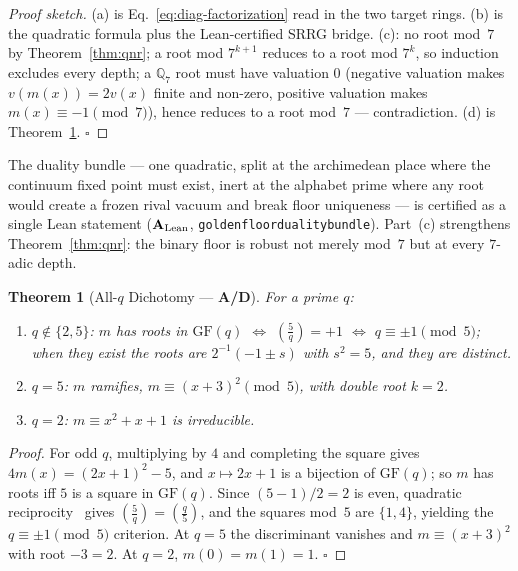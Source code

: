 \documentclass[11pt]{article}
\newtheorem{theorem}{Theorem}[section]
\theoremstyle{remark}
\newcommand{\GF}[1]{\ensuremath{\mathrm{GF}(#1)}}
\newcommand{\lean}[1]{%
  \penalty-100
  \begingroup\def\_{\textunderscore\allowbreak}\texttt{#1}\endgroup}
\newcommand{\CatAL}{\texorpdfstring{\ensuremath{\textbf{A}_{\rm Lean}}}{A-Lean}}
\newcommand{\CatAD}{\textbf{A/D}}
\begin{document}
\begin{proof}[Proof sketch]
(a) is Eq.~\eqref{eq:diag-factorization} read in the two target rings.
(b) is the quadratic formula plus the Lean-certified SRRG bridge.
(c): no root mod~$7$ by Theorem~\ref{thm:qnr}; a root mod $7^{k+1}$ reduces
to a root mod $7^k$, so induction excludes every depth; a $\mathbb{Q}_7$ root
must have valuation $0$ (negative valuation makes $v(m(x)) = 2v(x)$ finite
and non-zero, positive valuation makes $m(x) \equiv -1 \pmod 7$), hence
reduces to a root mod~$7$ --- contradiction. (d) is
Theorem~\ref{thm:allq}. $\square$
\end{proof}

The duality bundle --- one quadratic, split at the archimedean place where
the continuum fixed point must exist, inert at the alphabet prime where any
root would create a frozen rival vacuum and break floor uniqueness --- is
certified as a single Lean statement (\CatAL{},
\lean{golden\_floor\_duality\_bundle}). Part~(c) strengthens
Theorem~\ref{thm:qnr}: the binary floor is robust not merely mod~$7$ but at
every $7$-adic depth.

\begin{theorem}[All-$q$ Dichotomy --- \CatAD{}]
\label{thm:allq}
For a prime $q$:
\begin{enumerate}[leftmargin=2em,itemsep=2pt,topsep=2pt,label=(\roman*)]
  \item $q \notin \{2,5\}$: $m$ has roots in $\GF{q}$ $\iff$
    $\left(\tfrac{5}{q}\right) = +1$ $\iff$ $q \equiv \pm 1 \pmod 5$;
    when they exist the roots are $2^{-1}(-1 \pm s)$ with $s^2 = 5$,
    and they are distinct.
  \item $q = 5$: $m$ ramifies, $m \equiv (x+3)^2 \pmod 5$, with double
    root $k = 2$.
  \item $q = 2$: $m \equiv x^2 + x + 1$ is irreducible.
\end{enumerate}
\end{theorem}

\begin{proof}
For odd $q$, multiplying by $4$ and completing the square gives
$4m(x) = (2x+1)^2 - 5$, and $x \mapsto 2x+1$ is a bijection of $\GF{q}$;
so $m$ has roots iff $5$ is a square in $\GF{q}$. Since
$(5-1)/2 = 2$ is even, quadratic reciprocity~\cite{IrelandRosen1990} gives
$\left(\tfrac{5}{q}\right) = \left(\tfrac{q}{5}\right)$, and the squares
mod~$5$ are $\{1,4\}$, yielding the $q \equiv \pm 1 \pmod 5$ criterion.
At $q = 5$ the discriminant vanishes and $m \equiv (x+3)^2$ with root
$-3 = 2$. At $q = 2$, $m(0) = m(1) = 1$. $\square$
\end{proof}
\end{document}
